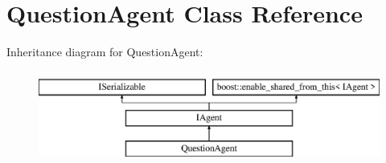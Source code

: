 \hypertarget{class_question_agent}{}\section{Question\+Agent Class Reference}
\label{class_question_agent}
Inheritance diagram for Question\+Agent\+:\begin{figure}[H]
\begin{center}
\leavevmode
\includegraphics[height=3.000000cm]{class_question_agent}
\end{center}
\end{figure}
